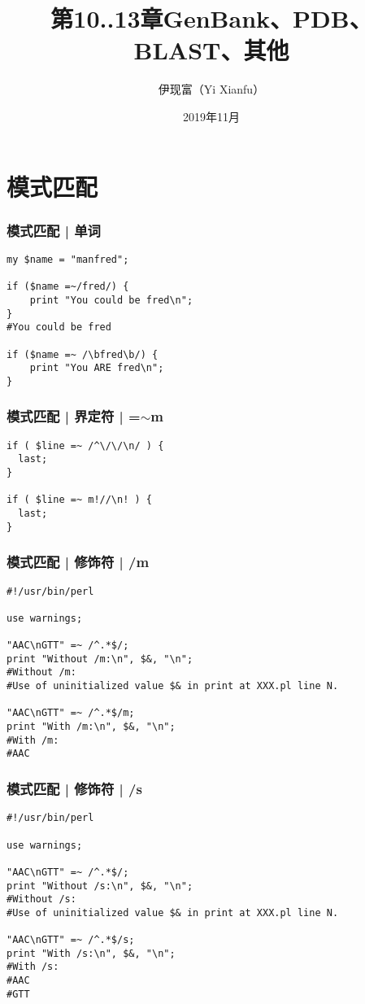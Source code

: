 


\title[其他]{第10..13章\quad GenBank、PDB、BLAST、其他}
\author[Yixf]{伊现富（Yi Xianfu）}
\date{2019年11月}




\section{模式匹配}
\begin{frame}[fragile]
  \frametitle{模式匹配 | 单词}
\begin{lstlisting}
my $name = "manfred";

if ($name =~/fred/) {
    print "You could be fred\n";
}
#You could be fred

if ($name =~ /\bfred\b/) {
    print "You ARE fred\n";
}
\end{lstlisting}
\end{frame}

\begin{frame}[fragile]
  \frametitle{模式匹配 | 界定符 | =$\sim$m}
\begin{lstlisting}
if ( $line =~ /^\/\/\n/ ) {
  last;
}

if ( $line =~ m!//\n! ) {
  last;
}
\end{lstlisting}
\end{frame}

\begin{frame}[fragile]
  \frametitle{模式匹配 | 修饰符 | /m}
\begin{lstlisting}
#!/usr/bin/perl

use warnings;

"AAC\nGTT" =~ /^.*$/;
print "Without /m:\n", $&, "\n";
#Without /m:
#Use of uninitialized value $& in print at XXX.pl line N.

"AAC\nGTT" =~ /^.*$/m;
print "With /m:\n", $&, "\n";
#With /m:
#AAC
\end{lstlisting}
\end{frame}

\begin{frame}[fragile]
  \frametitle{模式匹配 | 修饰符 | /s}
\begin{lstlisting}
#!/usr/bin/perl

use warnings;

"AAC\nGTT" =~ /^.*$/;
print "Without /s:\n", $&, "\n";
#Without /s:
#Use of uninitialized value $& in print at XXX.pl line N.

"AAC\nGTT" =~ /^.*$/s;
print "With /s:\n", $&, "\n";
#With /s:
#AAC
#GTT
\end{lstlisting}
\end{frame}

